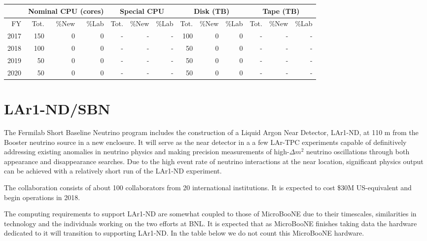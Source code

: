 \documentclass[pdftex,12pt,letter]{article}
\begin{document}
\begin{tabular}[h]{|r || r|r|r || r|r|r || r|r|r || r|r|r ||}
  \hline
   & \multicolumn{3}{c||}{Nominal CPU (cores)} & \multicolumn{3}{c||}{Special CPU} & \multicolumn{3}{c||}{Disk (TB)} & \multicolumn{3}{c||}{Tape (TB)} \\
   \hline
  FY & Tot. & \%New & \%Lab & Tot. & \%New & \%Lab & Tot. & \%New & \%Lab & Tot. & \%New & \%Lab \\
  \hline
  2017 & 150& 0& 0& -& -& -& 100& 0 & 0 & -& -& - \\
  \hline
  2018 & 100& 0& 0& -& -& -& 50& 0 & 0 & -& -& - \\
  \hline
  2019 & 50& 0& 0& -& -& -& 50& 0 & 0 & -& -& - \\
  \hline
 2020 & 50& 0& 0& -& -& -& 50& 0& 0& -& -& - \\
  \hline
\end{tabular}


\pagebreak
\section{LAr1-ND/SBN}



The Fermilab Short Baseline Neutrino program includes the construction
of a Liquid Argon Near Detector, LAr1-ND, at 110 m from the Booster
neutrino source in a new enclosure.
It will serve as the near detector in a a few LAr-TPC experiments
capable of definitively addressing existing anomalies in neutrino
physics and making precision measurements of high-$\Delta m^2$
neutrino oscillations through both appearance and disappearance
searches.
Due to the high event rate of neutrino interactions at the near
location, significant physics output can be achieved with a relatively
short run of the LAr1-ND experiment.  

The collaboration consists of about 100 collaborators from 20
international institutions.
It is expected to cost \$30M US-equivalent and begin operations in
2018. 

The computing requirements to support LAr1-ND are somewhat coupled to
those of MicroBooNE due to their timescales, similarities in
technology and the individuals working on the two efforts at BNL.
It is expected that as MicroBooNE finishes taking data the hardware
dedicated to it will transition to supporting LAr1-ND.
In the table below we do not count this MicroBooNE hardware.
\end{document}
